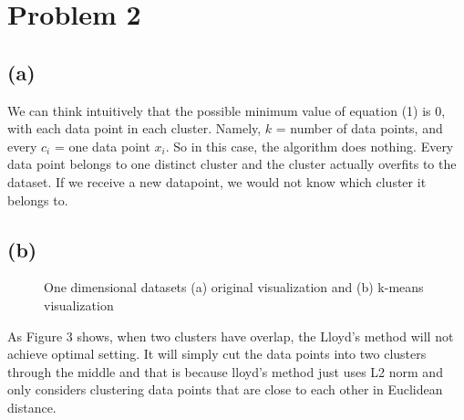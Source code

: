 \documentclass[]{homework}
\begin{document}
\section*{Problem 2}
\subsection*{(a)}
We can think intuitively that the possible minimum value of equation (1) is 0, with each data point in each cluster. Namely, $k$ = number of data points, and every $c_i$ = one data point $x_i$. So in this case, the algorithm does nothing. Every data point belongs to one distinct cluster and the cluster actually overfits to the dataset. If we receive a new datapoint, we would not know which cluster it belongs to.
\subsection*{(b)} 
\begin{figure}[h!]
\label{figure1}
\centering
{}%
\label{figure2a}
\hfil
{}%
\label{figure2b}
\caption{One dimensional datasets (a) original visualization and (b) k-means visualization}
\end{figure}\par
As Figure 3 shows, when two clusters have overlap, the Lloyd's method will not achieve optimal setting. It will simply cut the data points into two clusters through the middle and that is because lloyd's method just uses L2 norm and only considers clustering data points that are close to each other in Euclidean distance.
\end{document}
